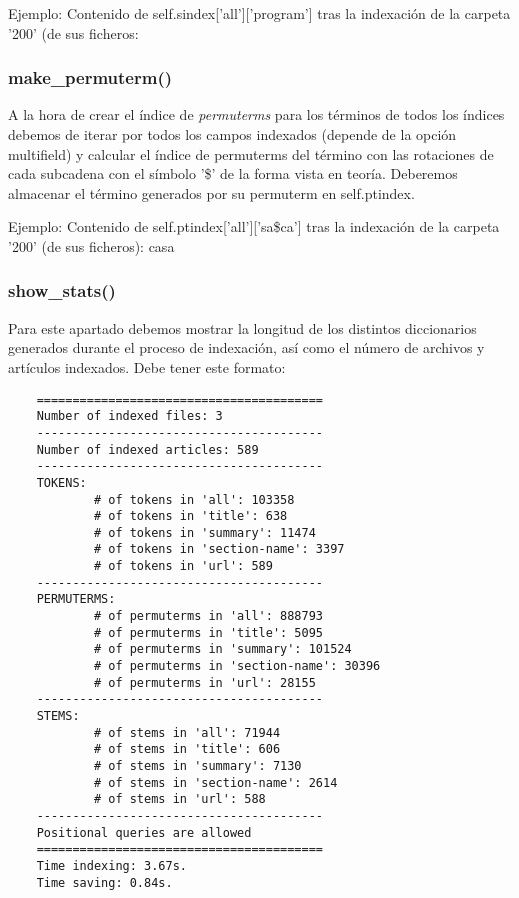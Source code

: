 \documentclass[12pt,a4paper]{article}
\begin{document}
Ejemplo: Contenido de self.sindex['all']['program'] tras la indexación de la carpeta '200' (de sus ficheros:


\subsubsection{make\_permuterm()}
A la hora de crear el índice de \textit{permuterms} para los términos de todos los índices debemos de iterar por todos los campos indexados (depende de la opción multifield) y calcular el índice de permuterms del término con las rotaciones de cada subcadena con el símbolo '\$' de la forma vista en teoría. Deberemos almacenar el término generados por su permuterm en self.ptindex.

Ejemplo: Contenido de self.ptindex['all']['sa\$ca'] tras la indexación de la carpeta '200' (de sus ficheros):
\newline
casa



\subsubsection{show\_stats()}
Para este apartado debemos mostrar la longitud de los distintos diccionarios generados durante el proceso de indexación, así como el número de archivos y artículos indexados. Debe tener este formato:

\begin{verbatim}
    ========================================
    Number of indexed files: 3
    ----------------------------------------
    Number of indexed articles: 589
    ----------------------------------------
    TOKENS:
            # of tokens in 'all': 103358
            # of tokens in 'title': 638
            # of tokens in 'summary': 11474
            # of tokens in 'section-name': 3397
            # of tokens in 'url': 589
    ----------------------------------------
    PERMUTERMS:
            # of permuterms in 'all': 888793
            # of permuterms in 'title': 5095
            # of permuterms in 'summary': 101524
            # of permuterms in 'section-name': 30396
            # of permuterms in 'url': 28155
    ----------------------------------------
    STEMS:
            # of stems in 'all': 71944
            # of stems in 'title': 606
            # of stems in 'summary': 7130
            # of stems in 'section-name': 2614
            # of stems in 'url': 588
    ----------------------------------------
    Positional queries are allowed
    ========================================
    Time indexing: 3.67s.
    Time saving: 0.84s.
\end{verbatim}
\end{document}
